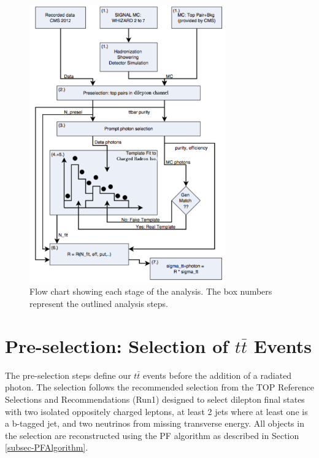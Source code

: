 \begin{figure}
\begin{center}
\includegraphics[width=0.75\textwidth]{Figures/AnalysisFlowChart2.png}
\end{center}
\caption{Flow chart showing each stage of the analysis. The box numbers represent the outlined
analysis steps.}
\label{fig-AnalysisFlowChart}
\end{figure}

\section{Pre-selection: Selection of $t\bar{t}$ Events} \label{sec-preselection}

The pre-selection steps define our $t\bar{t}$ events before the addition of a radiated photon. The selection follows the recommended selection from the TOP Reference Selections and Recommendations (Run1) \cite{TopEventSelection} designed to select dilepton final states with two isolated oppositely charged leptons, at least 2 jets where at least one is a b-tagged jet, and two neutrinos from missing transverse energy. All objects in the selection are reconstructed using the PF algorithm as described in Section \ref{subsec-PFAlgorithm}.  

